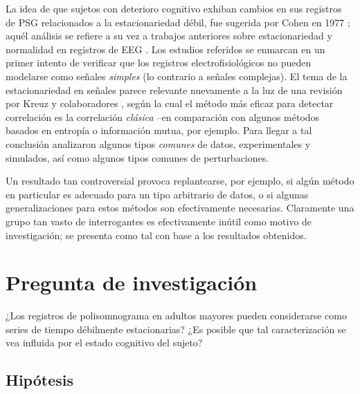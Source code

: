 La idea de que sujetos con deterioro cognitivo exhiban cambios en sus registros de PSG relacionados 
a la estacionariedad débil, fue sugerida por Cohen en 1977 \cite{Cohen77}; aquél análisis se 
refiere a su vez a trabajos anteriores sobre estacionariedad y normalidad en registros de EEG
\cite{McEwen75,Sugimoto78,Kawabata73}.
%
Los estudios referidos se enmarcan en un primer intento de verificar que los registros 
electrofisiológicos no pueden modelarse como señales \textit{simples} (lo contrario a señales 
complejas).
%
El tema de la estacionariedad en señales parece relevante nuevamente a la luz de una revisión
por Kreuz y colaboradores \cite{Kreuz07}, según la cual el método más eficaz para detectar 
correlación es la correlación \textit{clásica} --en comparación con algunos métodos basados en 
entropía o información mutua, por ejemplo. 
%
Para llegar a tal conclusión analizaron algunos tipos \textit{comunes} de datos, experimentales y 
simulados, así como algunos tipos comunes de perturbaciones.

Un resultado tan controversial provoca replantearse, por ejemplo, si algún método en particular es 
adecuado para un tipo arbitrario de datos, o si algunas generalizaciones para estos métodos son 
efectivamente necesarias.
%
Claramente una grupo tan vasto de interrogantes es efectivamente inútil como motivo de
investigación; se presenta como tal con base a los resultados obtenidos.


\section{Pregunta de investigación}

¿Los registros de polisomnograma en adultos mayores pueden considerarse como series de tiempo 
débilmente estacionarias?
%
¿Es posible que tal caracterización se vea influida por el estado cognitivo del sujeto?


\subsection{Hipótesis}


